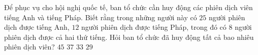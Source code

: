 \begin{ex}%
	Để phục vụ cho hội nghị quốc tế, ban tổ chức cần huy động các phiên dịch viên tiếng Anh và
	tiếng Pháp. Biết rằng trong những người này có $25$ người phiên dịch được tiếng Anh, $12$ người phiên dịch
	được tiếng Pháp, trong đó có $8$ người phiên dịch được cả hai thứ tiếng. Hỏi ban tổ chức đã huy động tất
	cả bao nhiêu phiên dịch viên?
	\choice
	{$45$}
	{$37$}
	{$33$}
	{\True $29$}
\end{ex}

